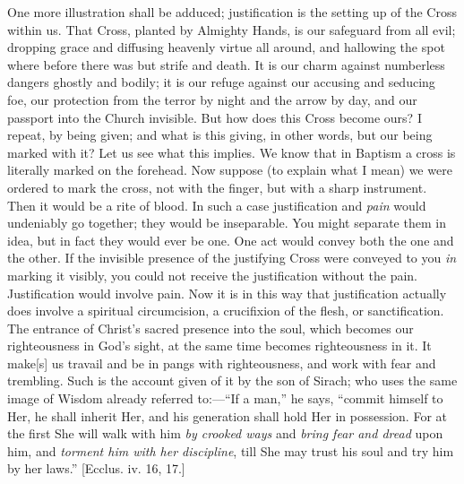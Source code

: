One more illustration shall be adduced; justification is the
setting up of the Cross within us. That Cross, planted by Almighty
Hands, is our safeguard from all evil; dropping grace and diffusing
heavenly virtue all around, and hallowing the spot where before there
was but strife and death. It is our charm against numberless dangers
ghostly and bodily; it is our refuge against our accusing and seducing
foe, our protection from the terror by night and the arrow by day, and
our passport into the Church invisible. But how does this Cross become
ours? I repeat, by being given; and what is this giving, in other
words, but our being marked with it? Let us see what this implies. We
know that in Baptism a cross is literally marked on the forehead. Now
suppose (to explain what I mean) we were ordered to mark the cross,
not with the finger, but with a sharp instrument. Then it would be a
rite of blood. In such a case justification and \emph{pain} would
undeniably go together; they would be inseparable. You might separate
them in idea, but in fact they would ever be one. One act would convey
both the one and the other. If the invisible presence of the
justifying Cross were conveyed to you \emph{in} marking it visibly,
you could not receive the justification without the pain.
Justification would involve pain. Now it is in this way that
justification actually does involve a spiritual circumcision, a
crucifixion of the flesh, or sanctification. The entrance of Christ's
sacred presence into the soul, which becomes our righteousness in
God's sight, at the same time becomes righteousness in it. It make[s]
us travail and be in pangs with righteousness, and work with fear and
trembling. Such is the account given of it by the son of Sirach; who
uses the same image of Wisdom already referred to:—``If a
man,'' he says, ``commit himself to Her, he shall inherit
Her, and his generation shall hold Her in possession. For at the first
She will walk with him \emph{by crooked ways} and \emph{bring fear and
dread} upon him, and \emph{torment him with her discipline}, till
She may trust his soul and try him by her laws.'' [Ecclus. iv. 16,
17.]

